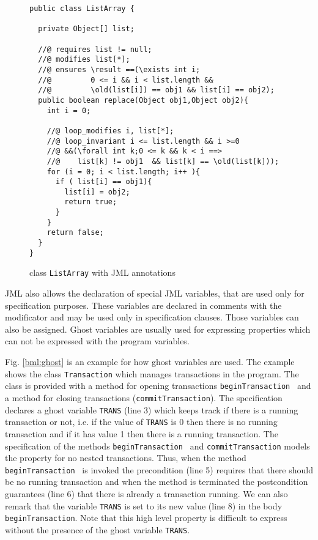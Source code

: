 \begin{figure}[ht!]
\begin{lstlisting}[frame=trbl] 
public class ListArray {
  
  private Object[] list;
  
  //@ requires list != null;
  //@ modifies list[*];
  //@ ensures \result ==(\exists int i; 
  //@         0 <= i && i < list.length && 
  //@         \old(list[i]) == obj1 && list[i] == obj2);
  public boolean replace(Object obj1,Object obj2){
    int i = 0;
    
    //@ loop_modifies i, list[*];
    //@ loop_invariant i <= list.length && i >=0 
    //@ &&(\forall int k;0 <= k && k < i ==> 
    //@    list[k] != obj1  && list[k] == \old(list[k]));
    for (i = 0; i < list.length; i++ ){
      if ( list[i] == obj1){
        list[i] = obj2;
        return true;	
      }
    }
    return false;
  }
}
\end{lstlisting}
\caption{\sc class \mbox{\rm \lstinline!ListArray!} with JML annotations} 
\label{replaceSrc}
\end{figure}

 JML also allows the declaration of special JML variables, that are used only for specification purposes. 
 These variables are declared in comments with the  modificator and may be used only in specification clauses. Those variables 
 can also be assigned. Ghost variables are usually used  for expressing properties which can not be expressed with the program variables.

 Fig. \ref{bml:ghost} is an example for how ghost variables are used. The example shows the class \texttt{Transaction}
 which manages transactions in the program. The class is provided with a method for opening transactions \texttt{beginTransaction } and 
 a method for closing transactions (\texttt{commitTransaction}).  The specification declares a ghost variable
 \texttt{TRANS} (line 3) which keeps track if there is  a running transaction or not, i.e. if the value of  \texttt{TRANS} is 0
 then there is no running transaction and if it has value 1 then there is
 a running transaction. The specification of the methods \texttt{beginTransaction } and \texttt{commitTransaction}
 models the property for no nested transactions. Thus, when the method  \texttt{beginTransaction } is invoked the precondition (line 5) requires
 that there should be no running transaction and when the method is terminated the postcondition guarantees (line 6) that there is already a transaction running.
 We can also remark that the variable  \texttt{TRANS} is set to its new value (line 8) in the  body  \texttt{beginTransaction}.
 Note that this high level property is difficult to express without the presence
 of the ghost variable \texttt{TRANS}.  

